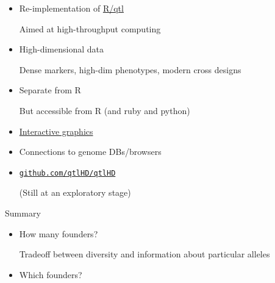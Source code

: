 \documentclass[12pt]{article}
\newcommand{\headsize}{\fontsize{35}{35} \selectfont}
\newcommand{\smallsize}{\fontsize{25}{30} \selectfont}
\newcommand{\smallersize}{\fontsize{20}{25} \selectfont}
\begin{document}
{\vspace{20mm}

\color{mywhite}
\smallsize

\hfill \begin{minipage}{10in}
\begin{itemize}
\itemsep16pt
\item Re-implementation of \href{http://www.rqtl.org}{R/qtl}

{\smallersize \color{myblue} Aimed at high-throughput computing}

\item High-dimensional data

{\smallersize \color{myblue} Dense markers, high-dim phenotypes,
  modern cross designs}

\item Separate from R

{\smallersize \color{myblue} But accessible from R (and ruby and python)}

\item \href{http://www.biostat.wisc.edu/~kbroman/D3}{Interactive graphics}

\item Connections to genome DBs/browsers

\item \href{http://github.com/qtlHD/qtlHD}{\tt github.com/qtlHD/qtlHD}

{\smallersize \color{myblue} (Still at an exploratory stage)}



\end{itemize}
\end{minipage}


\newpage

\headsize \color{myyellow}
\hfill \begin{minipage}{5.75in}
\centering
Summary
\end{minipage}

\vspace{15mm}

\color{mywhite}
\smallsize

\hfill \begin{minipage}{10in}
\begin{itemize}
\itemsep24pt
\item How many founders?

{\smallersize \color{myblue} Tradeoff between {\color{mypink} diversity} and information about
  {\color{mypink} particular alleles}}

\item Which founders?


\end{itemize}
\end{minipage}}
\end{document}
